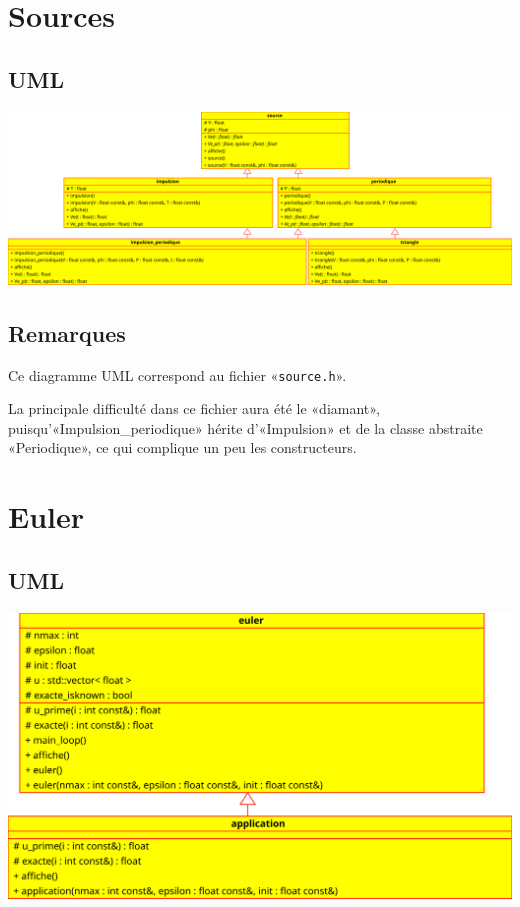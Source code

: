 \documentclass{report}
\begin{document}
\chapter{Sources}
    \begin{multicols}{2}
        \section{UML}
            \includegraphics[width=\linewidth+\linewidth,angle=90]{images/sources_large}

        \section{Remarques}
            Ce diagramme UML correspond au fichier «\verb|source.h|».

            La principale difficulté dans ce fichier aura été le «diamant», puisqu’«Impulsion\_periodique» hérite
            d’«Impulsion» et de la classe abstraite «Periodique», ce qui complique un peu les constructeurs.

    \end{multicols}

\chapter{Euler}
    \section{UML}
        \includegraphics{images/euler_alone}
\end{document}
